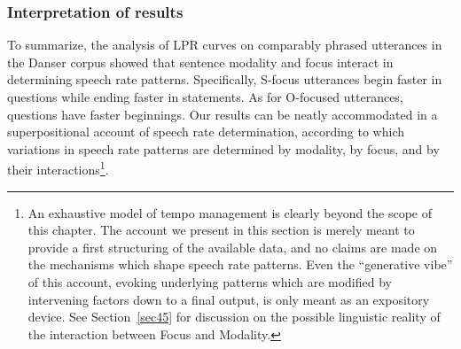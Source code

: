 \subsubsection{Interpretation of results}\label{sec4442}
To summarize, the analysis of LPR curves on comparably phrased utterances in the Danser corpus showed that sentence modality and focus interact in determining speech rate patterns. Specifically, S-focus utterances begin faster in questions while ending faster in statements. As for O-focused utterances, questions have faster beginnings. Our results can be neatly accommodated in a superpositional account of speech rate determination, according to which variations in speech rate patterns are determined by modality, by focus, and by their interactions\footnote{An exhaustive model of tempo management is clearly beyond the scope of this chapter. The account we present in this section is merely meant to provide a first structuring of the available data, and no claims are made on the mechanisms which shape speech rate patterns. Even the ``generative vibe'' of this account, evoking underlying patterns which are modified by intervening factors down to a final output, is only meant as an expository device. See Section~\ref{sec45} for discussion on the possible linguistic reality of the interaction between Focus and Modality.}. 

